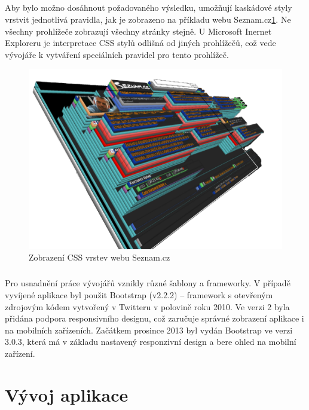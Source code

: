 \documentclass[11pt,a4paper,titlepage,oneside]{book}
\begin{document}
		\paragraph{} Aby bylo možno dosáhnout požadovaného výsledku, umožňují kaskádové styly vrstvit jednotlivá pravidla, jak je zobrazeno na příkladu webu Seznam.cz\ref{fig:seznam}. Ne všechny prohlížeče zobrazují všechny stránky stejně. U Microsoft Inernet Exploreru je interpretace CSS stylů odlišná od jiných prohlížečů, což vede vývojáře k vytváření speciálních pravidel pro tento prohlížeč.
		\begin{figure}[!h]
			\begin{center}
				\includegraphics[width=12cm]{obrazky/css_vrstvy.png}
				\caption{Zobrazení CSS vrstev webu Seznam.cz}
				\label{fig:seznam}
			\end{center}
		\end{figure}	
		\paragraph{} Pro usnadnění práce vývojářů vznikly různé šablony a frameworky. V případě vyvíjené aplikace byl použit Bootstrap (v2.2.2) -- framework s otevřeným zdrojovým kódem vytvořený v Twitteru v polovině roku 2010. Ve verzi 2 byla přidána podpora responsivního designu, což zaručuje správné zobrazení aplikace i na mobilních zařízeních. Začátkem prosince 2013 byl vydán Bootstrap ve verzi 3.0.3, která má v základu nastavený responzivní design a bere ohled na mobilní zařízení.
\chapter{Vývoj aplikace}
\end{document}
